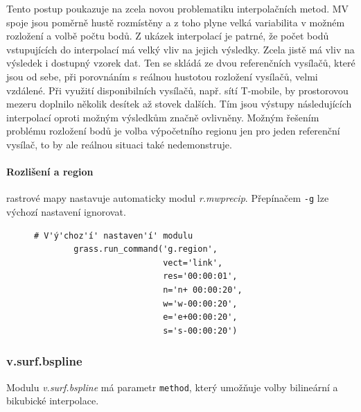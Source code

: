 \documentclass[a4paper,12pt,oneside]{report}
\begin{document}
Tento postup poukazuje na zcela novou problematiku interpolačních
metod. MV spoje jsou poměrně hustě rozmístěny a z toho plyne velká
variabilita v možném rozložení a volbě počtu bodů. Z ukázek
interpolací je patrné, že počet bodů vstupujících do interpolací má
velký vliv na jejich výsledky. Zcela jistě má vliv na výsledek i
dostupný vzorek dat. Ten se skládá ze dvou referenčních vysílačů,
které jsou od sebe, při porovnáním s reálnou hustotou rozložení
vysílačů, velmi vzdálené. Při využití disponibilních vysílačů, např.
sítí T-mobile, by prostorovou mezeru doplnilo několik desítek až
stovek dalších. Tím jsou výstupy následujících interpolací oproti
možným výsledkům značně ovlivněny. Možným řešením problému rozložení bodů je volba výpočetního regionu jen pro jeden referenční
vysílač, to by ale reálnou situaci také nedemonstruje.



\paragraph*{Rozlišení a region} rastrové mapy nastavuje automaticky modul \textit{r.mwprecip}. Přepínačem \texttt{-g} lze výchozí nastavení ignorovat.
\begin{figure}[h!]
\begin{footnotesize}
\lstset{extendedchars=false,
escapeinside=''}
\begin{lstlisting}[style=mybash]
# V'ý'choz'í' nastaven'í' modulu
        grass.run_command('g.region',
                          vect='link',
                          res='00:00:01',
                          n='n+ 00:00:20',
                          w='w-00:00:20',
                          e='e+00:00:20',
                          s='s-00:00:20')
\end{lstlisting}
\end{footnotesize} 
\end{figure}


\subsubsection*{v.surf.bspline}
Modulu \textit{v.surf.bspline} má parametr \texttt{method}, který umožňuje volby bilineární a bikubické interpolace.
\end{document}
